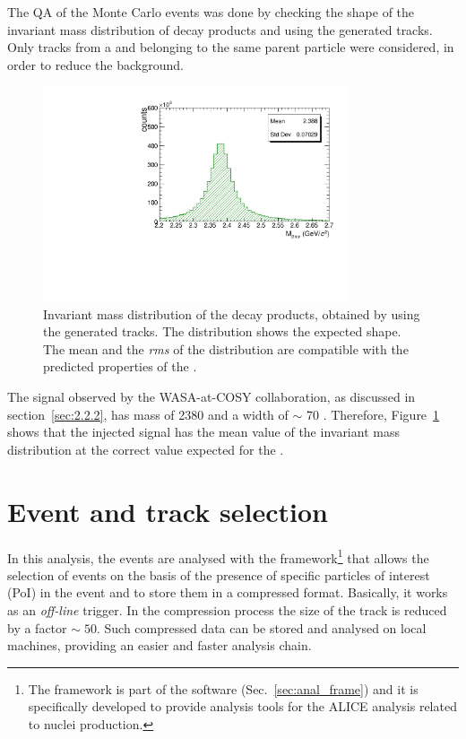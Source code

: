 The QA of the Monte Carlo events was done by checking the shape of the invariant mass distribution
of \dst decay products and using the generated tracks. Only tracks from a \dst and belonging to the
same parent particle were considered, in order to reduce the background. 

\begin{figure}
    \centering
    \includegraphics[width=0.8\textwidth]{gfx/valid}
	\caption{Invariant mass distribution of the \dst decay products, obtained by using the generated tracks. The distribution shows the expected shape. The mean and the \textit{rms} of the distribution are compatible with the predicted properties of the \dst.}
	\label{fig:valid}
\end{figure}

The signal observed by the WASA-at-COSY collaboration, as discussed in section~\ref{sec:2.2.2}, has
mass of 2380 \mevcs and a width of $\sim$ 70 \mevcs. Therefore, Figure~\ref{fig:valid} shows that the
injected signal has the mean value of the invariant mass distribution at the correct value expected
for the \dst.

%
%
\section{Event and track selection} \label{sec:4.2}

In this analysis, the events are analysed with the  framework\footnote{The  
framework is part of the  software (Sec.~\ref{sec:anal_frame}) and it is 
specifically developed to provide analysis tools for the ALICE analysis related to nuclei
production.} that allows the selection of events on the basis of the presence of specific particles 
of interest (PoI) in the event and to store them in a compressed format.
Basically, it works as an \textit{off-line} trigger.
In the compression process the size of the track is reduced by a factor $\sim\;50$.
Such compressed data can be stored and analysed on local machines, providing an easier and faster
analysis chain.

